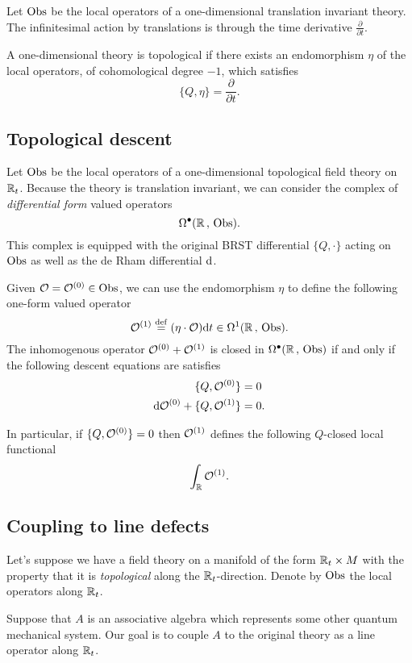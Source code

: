 \documentclass[11pt]{amsart}
\def\define{\overset{\rm def}{=}}
\begin{document}
Let ${\rm Obs}$ be the local operators of a one-dimensional translation invariant theory. 
The infinitesimal action by translations is through the time derivative $\frac{\partial}{\partial t}$. 

A one-dimensional theory is topological if there exists an endomorphism $\eta$ of the local operators, of cohomological degree $-1$, which satisfies
\[
\{Q, \eta\} = \frac{\partial}{\partial t} .
\]


\subsection{Topological descent} 

Let ${\rm Obs}$ be the local operators of a one-dimensional topological field theory on $\mathbb R_t$. 
Because the theory is translation invariant, we can consider the complex of {\em differential form} valued operators
\[
\Omega^\bullet(\mathbb R \, , \, {\rm Obs}) .
\]
This complex is equipped with the original BRST differential $\{Q, \cdot\}$ acting on ${\rm Obs}$ as well as the de Rham differential ${\rm d}$. 

Given $\mathcal O = \mathcal O^{(0)} \in {\rm Obs}$, we can use the endomorphism $\eta$ to define the following one-form valued operator
\[
\cO^{(1)} \define (\eta \cdot \cO) \d t \in \Omega^1(\RR \, , \, \Obs).
\]
The inhomogenous operator $\mathcal O^{(0)} + \mathcal O^{(1)}$ is closed in $\Omega^\bullet(\mathbb R \, , \, {\rm Obs})$ if and only if the following descent equations are satisfies
\begin{align*}
\{Q, \mathcal O^{(0)}\} & = 0 \\
{\rm d} \mathcal O^{(0)} + \{Q, \mathcal O^{(1)}\} & = 0 .
\end{align*}

In particular, if $\{Q,\mathcal O^{(0)}\} = 0$ then $\mathcal O^{(1)}$ defines the following $Q$-closed local functional
\[
\int_\mathbb R \mathcal O^{(1)} .
\]

\subsection{Coupling to line defects} 

Let's suppose we have a field theory on a manifold of the form $\mathbb R_t \times M$ with the property that it is {\em topological} along the $\mathbb R_t$-direction. 
Denote by ${\rm Obs}$ the local operators along $\mathbb R_t$. 

Suppose that $A$ is an associative algebra which represents some other quantum mechanical system. 
Our goal is to couple $A$ to the original theory as a line operator along $\mathbb R_t$. 
\end{document}
